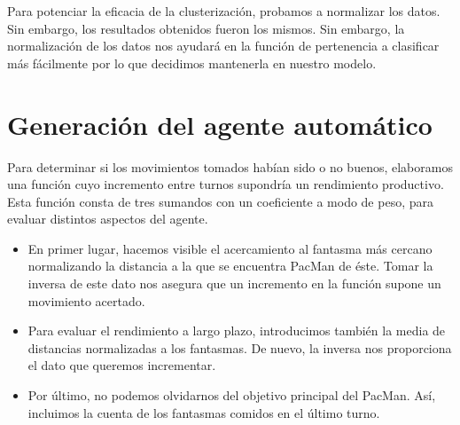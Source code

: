 \documentclass[12pt]{article}
\begin{document}

Para potenciar la eficacia de la clusterización, probamos a normalizar los datos. Sin embargo, los resultados obtenidos fueron los mismos. Sin embargo, la normalización de los datos nos ayudará en la función de pertenencia a clasificar más fácilmente por lo que decidimos mantenerla en nuestro modelo.





\newpage

\section{Generación del agente automático}


Para determinar si los movimientos tomados habían sido o no buenos, elaboramos una función cuyo incremento entre turnos supondría un rendimiento productivo. Esta función consta de tres sumandos con un coeficiente a modo de peso, para evaluar distintos aspectos del agente.

\begin{itemize}
    \item En primer lugar, hacemos visible el acercamiento al fantasma más cercano normalizando la distancia a la que se encuentra PacMan de éste. Tomar la inversa de este dato nos asegura que un incremento en la función supone un movimiento acertado.
    \item Para evaluar el rendimiento a largo plazo, introducimos también la media de distancias normalizadas a los fantasmas. De nuevo, la inversa nos proporciona el dato que queremos incrementar.
    \item Por último, no podemos olvidarnos del objetivo principal del PacMan. Así, incluimos la cuenta de los fantasmas comidos en el último turno.
\end{itemize}
\end{document}
